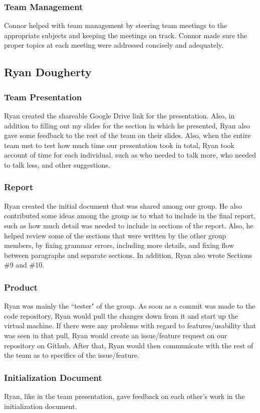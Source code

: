 \documentclass[12pt]{article}
\begin{document}
\begin{spacing}{1.5}
\subsubsection{Team Management}
Connor helped with team management by steering team meetings to the appropriate subjects and keeping the meetings on track. Connor made sure the proper topics at each meeting were addressed concisely and adequately.

\clearpage

\subsection{Ryan Dougherty}
\subsubsection{Team Presentation}
Ryan created the shareable Google Drive link for the presentation. Also, in addition to filling out my slides for the section in which he presented, Ryan also gave some feedback to the rest of the team on their slides. Also, when the entire team met to test how much time our presentation took in total, Ryan took account of time for each individual, such as who needed to talk more, who needed to talk less, and other suggestions.
\subsubsection{Report}
Ryan created the initial document that was shared among our group. He also contributed some ideas among the group as to what to include in the final report, such as how much detail was needed to include in sections of the report. Also, he helped review some of the sections that were written by the other group members, by fixing grammar errors, including more details, and fixing flow between paragraphs and separate sections. In addition, Ryan also wrote Sections \#9 and \#10.
\subsubsection{Product}
Ryan was mainly the ``tester" of the group. As soon as a commit was made to the code repository, Ryan would pull the changes down from it and start up the virtual machine. If there were any problems with regard to features/usability that was seen in that pull, Ryan would create an issue/feature request on our repository on Github. After that, Ryan would then communicate with the rest of the team as to specifics of the issue/feature.
\subsubsection{Initialization Document}
Ryan, like in the team presentation, gave feedback on each other's work in the initialization document. 

\end{spacing}
\end{document}
